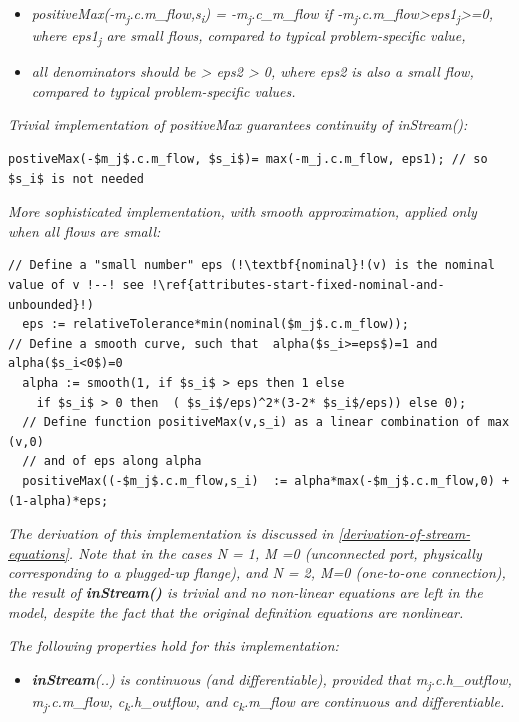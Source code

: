 \documentclass[10pt,a4paper]{report}
\begin{document}
\begin{itemize}
\item
  \emph{positiveMax(-m\textsubscript{j}.c.m\_flow,s\textsubscript{i}) =
  -m\textsubscript{j}.c\_m\_flow if
  -m\textsubscript{j}.c.m\_flow\textgreater{}eps1\textsubscript{j}\textgreater{}=0,
  where eps1\textsubscript{j} are small flows, compared to typical
  problem-specific value,}
\item
  \emph{all denominators should be \textgreater{} eps2 \textgreater{} 0,
  where eps2 is also a small flow, compared to typical problem-specific
  values.}
\end{itemize}

\emph{Trivial implementation of positiveMax guarantees continuity of
inStream():}
\begin{lstlisting}[language=modelica,mathescape=true]
postiveMax(-$m_j$.c.m_flow, $s_i$)= max(-m_j.c.m_flow, eps1); // so $s_i$ is not needed
\end{lstlisting}
\emph{More sophisticated implementation, with smooth approximation,
applied only when {all} flows are small:}
\begin{lstlisting}[language=modelica,escapechar=!]
// Define a "small number" eps (!\textbf{nominal}!(v) is the nominal value of v !--! see !\ref{attributes-start-fixed-nominal-and-unbounded}!)
  eps := relativeTolerance*min(nominal($m_j$.c.m_flow));
// Define a smooth curve, such that  alpha($s_i>=eps$)=1 and alpha($s_i<0$)=0
  alpha := smooth(1, if $s_i$ > eps then 1 else
    if $s_i$ > 0 then  ( $s_i$/eps)^2*(3-2* $s_i$/eps)) else 0);
  // Define function positiveMax(v,s_i) as a linear combination of max (v,0)
  // and of eps along alpha
  positiveMax((-$m_j$.c.m_flow,s_i)  := alpha*max(-$m_j$.c.m_flow,0) +  (1-alpha)*eps;
\end{lstlisting}


\emph{The derivation of this implementation is discussed in}
\emph{\ref{derivation-of-stream-equations}. Note that in the cases N = 1, M =0 (unconnected port,
physically corresponding to a plugged-up flange), and N = 2, M=0
(one-to-one connection), the result of \textbf{inStream()} is trivial
and no non-linear equations are left in the model, despite the fact that
the original definition equations are nonlinear.}

\emph{The following properties hold for this implementation:}

\begin{itemize}
\item
  \emph{\textbf{inStream}(..) is continuous (and differentiable),
  provided that m\textsubscript{j}.c.h}\_\emph{outflow,
  m\textsubscript{j}.c.m}\_\emph{flow,
  c\textsubscript{k}.h}\_\emph{outflow, and
  c\textsubscript{k}.m}\_\emph{flow are continuous and differentiable.}
\end{itemize}
\end{document}
